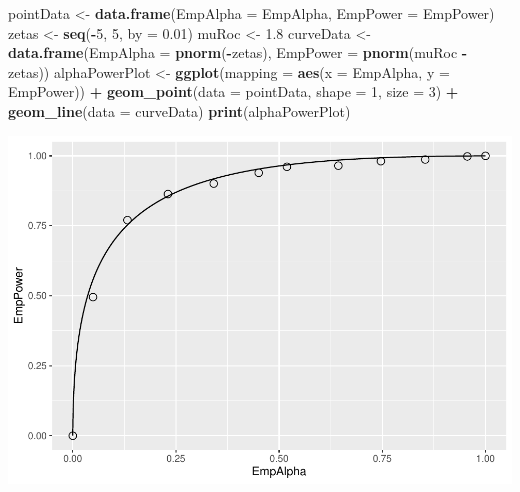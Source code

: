 \documentclass[
]{book}
\newenvironment{Shaded}{\begin{snugshade}}{\end{snugshade}}
\newcommand{\DataTypeTok}[1]{\textcolor[rgb]{0.13,0.29,0.53}{#1}}
\newcommand{\DecValTok}[1]{\textcolor[rgb]{0.00,0.00,0.81}{#1}}
\newcommand{\FloatTok}[1]{\textcolor[rgb]{0.00,0.00,0.81}{#1}}
\newcommand{\KeywordTok}[1]{\textcolor[rgb]{0.13,0.29,0.53}{\textbf{#1}}}
\newcommand{\NormalTok}[1]{#1}
\newcommand{\OperatorTok}[1]{\textcolor[rgb]{0.81,0.36,0.00}{\textbf{#1}}}
\newcommand{\StringTok}[1]{\textcolor[rgb]{0.31,0.60,0.02}{#1}}
\begin{document}
\begin{Shaded}
\begin{Highlighting}[]
\NormalTok{pointData \textless{}{-}}\StringTok{ }\KeywordTok{data.frame}\NormalTok{(}\DataTypeTok{EmpAlpha =}\NormalTok{ EmpAlpha, }\DataTypeTok{EmpPower =}\NormalTok{ EmpPower)}
\NormalTok{zetas \textless{}{-}}\StringTok{ }\KeywordTok{seq}\NormalTok{(}\OperatorTok{{-}}\DecValTok{5}\NormalTok{, }\DecValTok{5}\NormalTok{, }\DataTypeTok{by =} \FloatTok{0.01}\NormalTok{)}
\NormalTok{muRoc \textless{}{-}}\StringTok{ }\FloatTok{1.8}
\NormalTok{curveData \textless{}{-}}\StringTok{ }\KeywordTok{data.frame}\NormalTok{(}\DataTypeTok{EmpAlpha =} \KeywordTok{pnorm}\NormalTok{(}\OperatorTok{{-}}\NormalTok{zetas),}
  \DataTypeTok{EmpPower =} \KeywordTok{pnorm}\NormalTok{(muRoc }\OperatorTok{{-}}\StringTok{ }\NormalTok{zetas))}
\NormalTok{alphaPowerPlot \textless{}{-}}\StringTok{ }\KeywordTok{ggplot}\NormalTok{(}\DataTypeTok{mapping =} \KeywordTok{aes}\NormalTok{(}\DataTypeTok{x =}\NormalTok{ EmpAlpha, }\DataTypeTok{y =}\NormalTok{ EmpPower)) }\OperatorTok{+}\StringTok{ }
\StringTok{  }\KeywordTok{geom\_point}\NormalTok{(}\DataTypeTok{data =}\NormalTok{ pointData, }\DataTypeTok{shape =} \DecValTok{1}\NormalTok{, }\DataTypeTok{size =} \DecValTok{3}\NormalTok{) }\OperatorTok{+}\StringTok{ }
\StringTok{  }\KeywordTok{geom\_line}\NormalTok{(}\DataTypeTok{data =}\NormalTok{ curveData)}
\KeywordTok{print}\NormalTok{(alphaPowerPlot)}
\end{Highlighting}
\end{Shaded}

\includegraphics{08-hypothesis-testing_files/figure-latex/unnamed-chunk-7-1.pdf}
\end{document}
